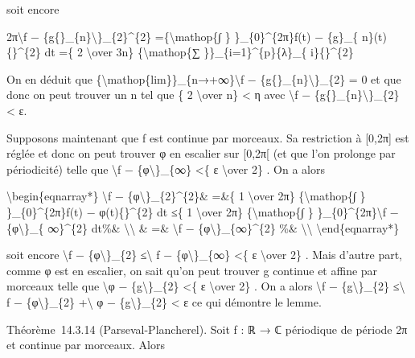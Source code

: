 \documentclass[]{article}
\begin{document}
soit encore

2π\textbackslash{}\textbar{}f −
\{g\{\}\_\{n\}\textbackslash{}\textbar{}\}\_\{2\}\^{}\{2\}
=\{\textbackslash{}mathop\{∫ \} \}\_\{0\}\^{}\{2π\}\textbar{}f(t) −
\{g\}\_\{ n\}(t)\{\textbar{}\}\^{}\{2\} dt =\{ 2 \textbackslash{}over
3n\} \{\textbackslash{}mathop\{∑
\}\}\_\{i=1\}\^{}\{p\}\textbar{}\{λ\}\_\{ i\}\{\textbar{}\}\^{}\{2\}

On en déduit que
\{\textbackslash{}mathop\{lim\}\}\_\{n→+∞\}\textbackslash{}\textbar{}f −
\{g\{\}\_\{n\}\textbackslash{}\textbar{}\}\_\{2\} = 0 et que donc on
peut trouver un n tel que \{ 2 \textbackslash{}over n\} \textless{} η
avec \textbackslash{}\textbar{}f −
\{g\{\}\_\{n\}\textbackslash{}\textbar{}\}\_\{2\} \textless{} ε.

Supposons maintenant que f est continue par morceaux. Sa restriction à
{[}0,2π{]} est réglée et donc on peut trouver φ en escalier sur
{[}0,2π{[} (et que l'on prolonge par périodicité) telle que
\textbackslash{}\textbar{}f − \{φ\textbackslash{}\textbar{}\}\_\{∞\}
\textless{}\{ ε \textbackslash{}over 2\} . On a alors

\textbackslash{}begin\{eqnarray*\} \textbackslash{}\textbar{}f −
\{φ\textbackslash{}\textbar{}\}\_\{2\}\^{}\{2\}\& =\&\{ 1
\textbackslash{}over 2π\} \{\textbackslash{}mathop\{∫ \}
\}\_\{0\}\^{}\{2π\}\textbar{}f(t) − φ(t)\{\textbar{}\}\^{}\{2\} dt ≤\{ 1
\textbackslash{}over 2π\} \{\textbackslash{}mathop\{∫ \}
\}\_\{0\}\^{}\{2π\}\textbackslash{}\textbar{}f −
\{φ\textbackslash{}\textbar{}\}\_\{ ∞\}\^{}\{2\} dt\%\&
\textbackslash{}\textbackslash{} \& =\& \textbackslash{}\textbar{}f −
\{φ\textbackslash{}\textbar{}\}\_\{∞\}\^{}\{2\} \%\&
\textbackslash{}\textbackslash{} \textbackslash{}end\{eqnarray*\}

soit encore \textbackslash{}\textbar{}f −
\{φ\textbackslash{}\textbar{}\}\_\{2\} ≤\textbackslash{}\textbar{} f −
\{φ\textbackslash{}\textbar{}\}\_\{∞\} \textless{}\{ ε
\textbackslash{}over 2\} . Mais d'autre part, comme φ est en escalier,
on sait qu'on peut trouver g continue et affine par morceaux telle que
\textbackslash{}\textbar{}φ − \{g\textbackslash{}\textbar{}\}\_\{2\}
\textless{}\{ ε \textbackslash{}over 2\} . On a alors
\textbackslash{}\textbar{}f − \{g\textbackslash{}\textbar{}\}\_\{2\}
≤\textbackslash{}\textbar{} f − \{φ\textbackslash{}\textbar{}\}\_\{2\}
+\textbackslash{}\textbar{} φ − \{g\textbackslash{}\textbar{}\}\_\{2\}
\textless{} ε ce qui démontre le lemme.

Théorème~14.3.14 (Parseval-Plancherel). Soit f : ℝ → ℂ périodique de
période 2π et continue par morceaux. Alors
\end{document}
